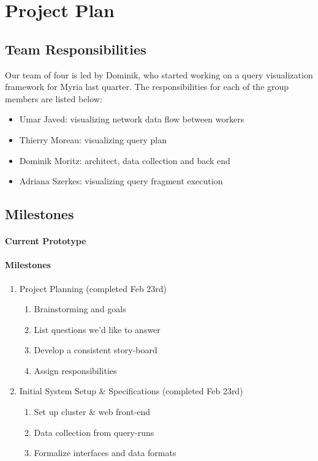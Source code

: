 \section{Project Plan}

\subsection{Team Responsibilities}

Our team of four is led by Dominik, who started working on a query visualization framework for Myria last quarter. The responsibilities for each of the group members are listed below:

\begin {itemize}
    \item Umar Javed: visualizing network data flow between workers
    \item Thierry Moreau: visualizing query plan
    \item Dominik Moritz: architect, data collection and back end
    \item Adriana Szerkes: visualizing query fragment execution
\end{itemize}

\subsection{Milestones}

\paragraph{Current Prototype} 

\paragraph{Milestones}


\begin{enumerate}
    \item Project Planning (completed Feb 23rd)
    \begin{enumerate}
        \item Brainstorming and goals
        \item List questions we'd like to answer
        \item Develop a consistent story-board
        \item Assign responsibilities
    \end{enumerate}
    \item Initial System Setup \& Specifications (completed Feb 23rd)
    \begin{enumerate}
        \item Set up cluster \& web front-end
        \item Data collection from query-runs
        \item Formalize interfaces and data formats
    \end{enumerate}
    
\end{enumerate}




